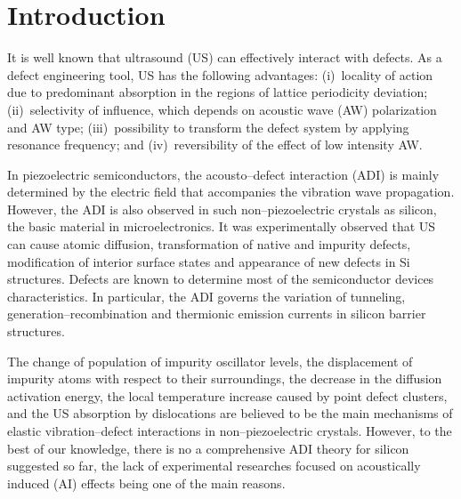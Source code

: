 \documentclass[aip,jap, amsmath,amssymb,reprint]{revtex4-1}
\begin{document}
\section{Introduction}
It is well known that ultrasound (US) can effectively interact with defects.
As a defect engineering tool, US has the following advantages:
(i)~locality of action due to predominant absorption in the regions of lattice periodicity deviation;
(ii)~selectivity of influence, which depends on acoustic wave (AW) polarization and AW type;
(iii)~possibility to transform the defect system by applying resonance frequency;
and (iv)~reversibility of the effect of low intensity AW.

In piezoelectric semiconductors, the acousto--defect interaction (ADI) is mainly determined by the electric field that accompanies the vibration wave propagation.
However, the ADI is also observed in such non--piezoelectric crystals as silicon, the basic material in microelectronics.
It was experimentally observed that US can cause
atomic diffusion, \cite{Roman:2010JAP,Roman:2007APL}
transformation of native and impurity defects, \cite{Ostapenko1994,Korotchenkov1995,Olikh2009Sem,Ostapenko1995,Ostrovskii2001}
modification of interior surface states\cite{UST:Medvid,Zaver:2008,Mirsagatov}
and appearance of new defects\cite{Savkina2015,Virot} in  Si structures.
Defects are known to determine most of the semiconductor devices characteristics.
In particular, the ADI governs the variation of tunneling, \cite{Olikh2016JSem,Olikh2011Sem} generation--recombination \cite{Davletova2009,Davletova2008,YOlikh2005} and  thermionic emission \cite{OlikhJAP,Olikh:Ultras} currents in silicon barrier structures.


The change  of  population  of  impurity  oscillator  levels,  \cite{Pavlovich}
the displacement of impurity atoms with respect to their surroundings, \cite{Korotchenkov1995,MirzadeJAP2011,PeleshchakUJF2016}
the decrease in the diffusion activation  energy, \cite{Krevchik}
the local temperature increase caused  by point defect clusters,\cite{MirzadeJAP2005}
and the US absorption by dislocations\cite{Davletova2008,OstrovKor92,Olikh:Ultras2016}
are believed to be the main mechanisms of elastic vibration--defect interactions in non--piezoelectric crystals.
However, to the best of our knowledge, there is no a comprehensive ADI theory for silicon suggested so far, the lack of experimental researches focused on acoustically induced (AI) effects being one of the main reasons.
\end{document}
